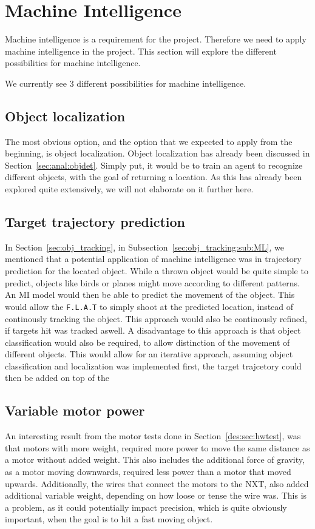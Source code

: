 \section{Machine Intelligence}\label{Design:MI}
Machine intelligence is a requirement for the project.
Therefore we need to apply machine intelligence in the project.
This section will explore the different possibilities for machine intelligence.

We currently see 3 different possibilities for machine intelligence.

\subsection{Object localization}
The most obvious option, and the option that we expected to apply from the beginning, is object localization.
Object localization has already been discussed in Section~\ref{sec:anal:objdet}.
Simply put, it would be to train an agent to recognize different objects, with the goal of returning a location.
As this has already been explored quite extensively, we will not elaborate on it further here.

\subsection{Target trajectory prediction}
In Section~\ref{sec:obj_tracking}, in Subsection~\ref{sec:obj_tracking:sub:ML}, we mentioned that a potential application of machine intelligence was in trajectory prediction for the located object.
While a thrown object would be quite simple to predict, objects like birds or planes might move according to different patterns.
An MI model would then be able to predict the movement of the object.
This would allow the \texttt{F.L.A.T} to simply shoot at the predicted location, instead of continously tracking the object.
This approach would also be continously refined, if targets hit was tracked aswell.
A disadvantage to this approach is that object classification would also be required, to allow distinction of the movement of different objects.
This would allow for an iterative approach, assuming object classification and localization was implemented first, the target trajcetory could then be added on top of the

\subsection{Variable motor power}
An interesting result from the motor tests done in Section~\ref{des:sec:hwtest}, was that motors with more weight, required more power to move the same distance as a motor without added weight.
This also includes the additional force of gravity, as a motor moving downwards, required less power than a motor that moved upwards.
Additionally, the wires that connect the motors to the NXT, also added additional variable weight, depending on how loose or tense the wire was.
This is a problem, as it could potentially impact precision, which is quite obviously important, when the goal is to hit a fast moving object.

